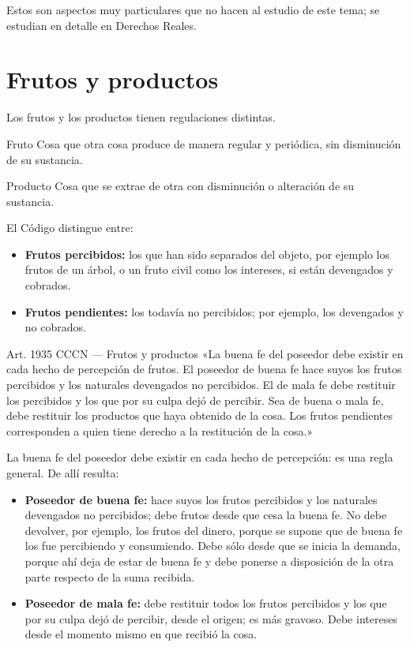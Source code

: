 \documentclass[12pt,oneside]{book}
\begin{document}
Estos son aspectos muy particulares que no hacen al estudio de este tema; se estudian en detalle en Derechos Reales.

\section{Frutos y productos}

Los frutos y los productos tienen regulaciones distintas.

\begin{definition}{Fruto}
Cosa que otra cosa produce de manera regular y periódica, sin disminución de su sustancia.
\end{definition}

\begin{definition}{Producto}
Cosa que se extrae de otra con disminución o alteración de su sustancia.
\end{definition}

El Código distingue entre:

\begin{itemize}
    \item \textbf{Frutos percibidos:} los que han sido separados del objeto, por ejemplo los frutos de un árbol, o un fruto civil como los intereses, si están devengados y cobrados.
    \item \textbf{Frutos pendientes:} los todavía no percibidos; por ejemplo, los devengados y no cobrados.
\end{itemize}

\begin{articulo}{Art. 1935 CCCN --- Frutos y productos}
«La buena fe del poseedor debe existir en cada hecho de percepción de frutos. El poseedor de buena fe hace suyos los frutos percibidos y los naturales devengados no percibidos. El de mala fe debe restituir los percibidos y los que por su culpa dejó de percibir. Sea de buena o mala fe, debe restituir los productos que haya obtenido de la cosa. Los frutos pendientes corresponden a quien tiene derecho a la restitución de la cosa.»
\end{articulo}

La buena fe del poseedor debe existir en cada hecho de percepción: es una regla general. De allí resulta:

\begin{itemize}
    \item \textbf{Poseedor de buena fe:} hace suyos los frutos percibidos y los naturales devengados no percibidos; debe frutos desde que cesa la buena fe. No debe devolver, por ejemplo, los frutos del dinero, porque se supone que de buena fe los fue percibiendo y consumiendo. Debe sólo desde que se inicia la demanda, porque ahí deja de estar de buena fe y debe ponerse a disposición de la otra parte respecto de la suma recibida.
    \item \textbf{Poseedor de mala fe:} debe restituir todos los frutos percibidos y los que por su culpa dejó de percibir, desde el origen; es más gravoso. Debe intereses desde el momento mismo en que recibió la cosa.
\end{itemize}
\end{document}
